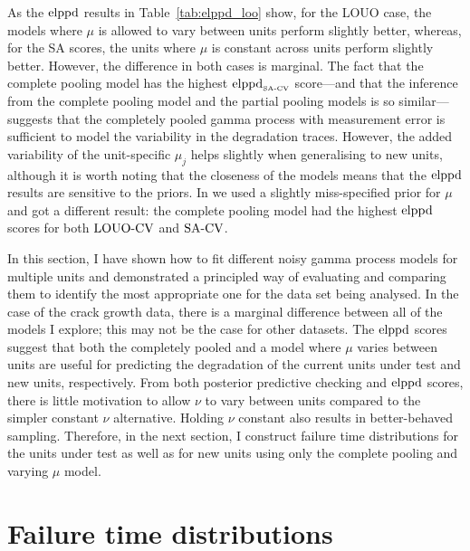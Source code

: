 As the $\hbox{elppd}$ results in Table~\ref{tab:elppd_loo} show, for the LOUO case, the models where $\mu$ is allowed to vary between units perform slightly better, whereas, for the SA scores, the units where $\mu$ is constant across units perform slightly better. However, the difference in both cases is marginal. The fact that the complete pooling model has the highest $\hbox{elppd}_{\hbox{\tiny{SA-CV}}}$ score---and that the inference from the complete pooling model and the partial pooling models is so similar---suggests that the completely pooled gamma process with measurement error is sufficient to model the variability in the degradation traces. However, the added variability of the unit-specific $\mu_j$ helps slightly when generalising to new units, although it is worth noting that the closeness of the models means that the $\hbox{elppd}$ results are sensitive to the priors. In \citet{leadbetter2024} we used a slightly miss-specified prior for $\mu$ and got a different result: the complete pooling model had the highest $\hbox{elppd}$ scores for both $\hbox{LOUO-CV}$ and $\hbox{SA-CV}$.

In this section, I have shown how to fit different noisy gamma process models for multiple units and demonstrated a principled way of evaluating and comparing them to identify the most appropriate one for the data set being analysed. In the case of the crack growth data, there is a marginal difference between all of the models I explore; this may not be the case for other datasets. The $\hbox{elppd}$ scores suggest that both the completely pooled and a model where $\mu$ varies between units are useful for predicting the degradation of the current units under test and new units, respectively. From both posterior predictive checking and $\hbox{elppd}$ scores, there is little motivation to allow $\nu$ to vary between units compared to the simpler constant $\nu$ alternative. Holding $\nu$ constant also results in better-behaved sampling. Therefore, in the next section, I construct failure time distributions for the units under test as well as for new units using only the complete pooling and varying $\mu$ model.

\section{Failure time distributions} \label{sec:unit-to-unit-ft}

